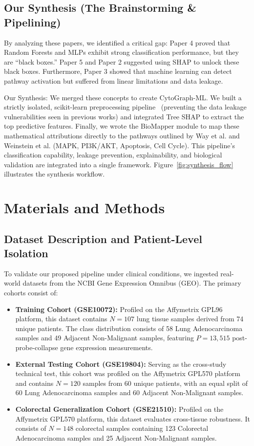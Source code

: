\documentclass[journal,10pt]{IEEEtran}
\begin{document}
\subsection{Our Synthesis (The Brainstorming \& Pipelining)}
By analyzing these papers, we identified a critical gap: Paper 4 proved that Random Forests and MLPs exhibit strong classification performance, but they are ``black boxes.'' Paper 5 and Paper 2 suggested using SHAP to unlock these black boxes. Furthermore, Paper 3 showed that machine learning can detect pathway activation but suffered from linear limitations and data leakage.

Our Synthesis: We merged these concepts to create CytoGraph-ML. We built a strictly isolated, scikit-learn preprocessing pipeline~\cite{scikit} (preventing the data leakage vulnerabilities seen in previous works) and integrated Tree SHAP to extract the top predictive features. Finally, we wrote the BioMapper module to map these mathematical attributions directly to the pathways outlined by Way et al. and Weinstein et al. (MAPK, PI3K/AKT, Apoptosis, Cell Cycle). This pipeline's classification capability, leakage prevention, explainability, and biological validation are integrated into a single framework. Figure~\ref{fig:synthesis_flow} illustrates the synthesis workflow.

\section{Materials and Methods}

\subsection{Dataset Description and Patient-Level Isolation}
To validate our proposed pipeline under clinical conditions, we ingested real-world datasets from the NCBI Gene Expression Omnibus (GEO). The primary cohorts consist of:
\begin{itemize}
    \item \textbf{Training Cohort (GSE10072):} Profiled on the Affymetrix GPL96 platform, this dataset contains $N = 107$ lung tissue samples derived from 74 unique patients. The class distribution consists of 58 Lung Adenocarcinoma samples and 49 Adjacent Non-Malignant samples, featuring $P = 13,515$ post-probe-collapse gene expression measurements.
    \item \textbf{External Testing Cohort (GSE19804):} Serving as the cross-study technical test, this cohort was profiled on the Affymetrix GPL570 platform and contains $N = 120$ samples from 60 unique patients, with an equal split of 60 Lung Adenocarcinoma samples and 60 Adjacent Non-Malignant samples.
    \item \textbf{Colorectal Generalization Cohort (GSE21510):} Profiled on the Affymetrix GPL570 platform, this dataset evaluates cross-tissue robustness. It consists of $N = 148$ colorectal samples containing 123 Colorectal Adenocarcinoma samples and 25 Adjacent Non-Malignant samples.
\end{itemize}
\end{document}
